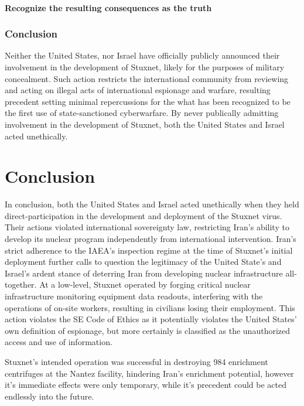 \documentclass[12pt]{article}
\begin{document}
\begin{multicols}{2}
\paragraph{Recognize the resulting consequences as the truth}

\subsubsection{Conclusion}

Neither the United States, nor Israel have officially publicly announced their involvement in the development of Stuxnet, likely for the purposes of military concealment. Such action restricts the international community from reviewing and acting on illegal acts of international espionage and warfare, resulting precedent setting minimal repercussions for the what has been recognized to be the first use of state-sanctioned cyberwarfare. By never publically admitting involvement in the development of Stuxnet, both the United States and Israel acted unethically.


\section{Conclusion}

In conclusion, both the United States and Israel acted unethically when they held direct-participation in the development and deployment of the Stuxnet virus. Their actions violated international sovereignty law, restricting Iran's ability to develop its nuclear program independently from international intervention. Iran's strict adherence to the IAEA's inspection regime at the time of Stuxnet's initial deployment further calls to question the legitimacy of the United State's and Israel's ardent stance of deterring Iran from developing nuclear infrastructure all-together. At a low-level, Stuxnet operated by forging critical nuclear infrastructure monitoring equipment data readouts, interfering with the operations of on-site workers, resulting in civilians losing their employment. This action violates the SE Code of Ethics as it potentially violates the United States' own definition of espionage, but more certainly is classified as the unauthorized access and use of information.

Stuxnet's intended operation was successful in destroying 984 enrichment centrifuges at the Nantez facility, hindering Iran's enrichment potential, however it's immediate effects were only temporary, while it's precedent could be acted endlessly into the future.
 

\end{multicols}




\newpage

\end{document}
